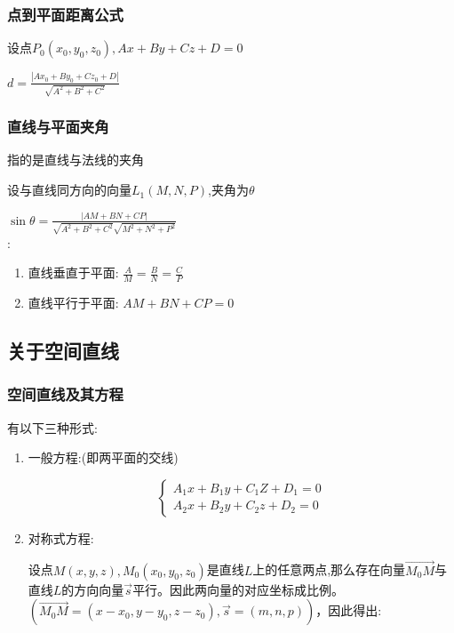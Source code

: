\documentclass[UTF8]{ctexbook}
\begin{document}
{{{    \subsubsection{点到平面距离公式}{
      设点$P_0(x_0,y_0,z_0),Ax + By + Cz + D = 0$

      $d = \frac{|Ax_0 + By_0 + Cz_0 + D|}{\sqrt{A^2 + B^2 + C^2}}$
    }%

    \subsubsection{直线与平面夹角}{
      指的是直线与法线的夹角

      设与直线同方向的向量$L_1(M,N,P)$,夹角为$\theta$

      $\sin\theta = \frac{|AM + BN + CP|}{\sqrt{A^2 + B^2 + C^2}\sqrt{M^2 + N^2 + P^2}}$\\

      :
      \begin{enumerate}
        \item 直线垂直于平面: $\frac{A}{M} = \frac{B}{N} = \frac{C}{P}$
        \item 直线平行于平面: $AM + BN + CP = 0$
      \end{enumerate}
    }%

  }%

  \subsection{关于空间直线}{

    \subsubsection{空间直线及其方程}{
      有以下三种形式:

      \begin{enumerate}
        \item {
              一般方程:(即两平面的交线)

              $$
                \begin{cases}
                  A_1x + B_1y + C_1Z + D_1 = 0 \\
                  A_2x + B_2y + C_2z + D_2 = 0
                \end{cases}
              $$
              }
        \item {
              对称式方程:

              设点$M(x,y,z),M_0(x_0,y_0,z_0)$是直线$L$上的任意两点,那么存在向量$\vec{M_0M}$与直线$L$的方向向量$\vec{s}$平行。因此两向量的对应坐标成比例。$(\vec{M_0M} = (x - x_0, y - y_0, z - z_0), \vec{s} = (m,n,p))$，因此得出:

}
\end{enumerate}}}}}
\end{document}
